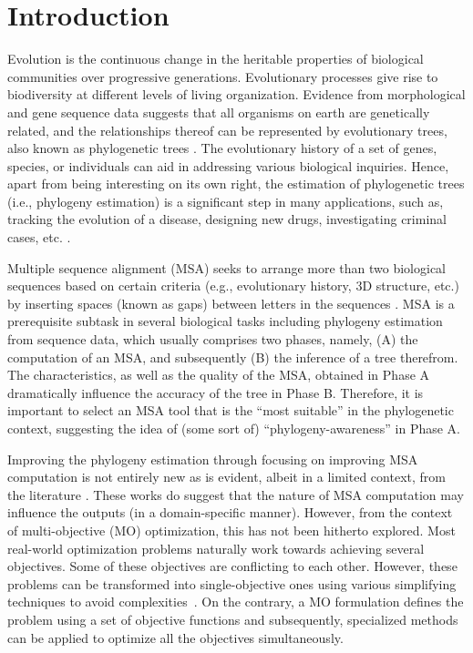 \chapter{Introduction}
\label{ch:introduction}
Evolution is the continuous change in the heritable properties of biological communities over progressive generations. Evolutionary processes give rise to biodiversity at different levels of living organization. 
Evidence from morphological and gene sequence data suggests that all organisms on earth are genetically related, and the relationships thereof can be represented by evolutionary trees, also known as phylogenetic trees \cite{warnow2017computational}. The evolutionary history of a set of genes, species, or individuals can aid in addressing various biological inquiries. Hence, apart from being interesting on its own right, the estimation of phylogenetic trees (i.e., phylogeny estimation) is a significant step in many applications, such as, tracking the evolution of a disease, designing new drugs, investigating criminal cases, etc. \cite{bush1999predicting, aluru2005handbook}. 

Multiple sequence alignment (MSA) seeks to arrange more than two biological sequences based on certain criteria (e.g., evolutionary history, 3D structure, etc.) by inserting spaces (known as gaps) between letters in the sequences \cite{warnow2017computational}. MSA is a prerequisite subtask in several biological tasks including phylogeny estimation from sequence data, which usually comprises two phases, namely, (A) the computation of an MSA, and subsequently (B) the inference of a tree therefrom. The characteristics, as well as the quality of the MSA, obtained in Phase A dramatically influence the accuracy of the tree in Phase B. Therefore, it is important to select an MSA tool that is the “most suitable” in the phylogenetic context, suggesting the idea of (some sort of) “phylogeny-awareness” in Phase A. 

Improving the phylogeny estimation through focusing on improving MSA computation is not entirely new as is evident, albeit in a limited context, from the literature \cite{redelings2005joint, ashkenazy2018multiple, warnow2013large}. These works do suggest that the nature of MSA computation may influence the outputs (in a domain-specific manner). However, from the context of multi-objective (MO) optimization, this has not been hitherto explored. Most real-world optimization problems naturally work towards achieving several objectives. Some of these objectives are conflicting to each other. However, these problems can be transformed into single-objective ones using various simplifying techniques to avoid complexities~\citep{kalyanmoy2001multi}. On the contrary, a MO formulation defines the problem using a set of objective functions and subsequently, specialized methods can be applied to optimize all the objectives simultaneously.

